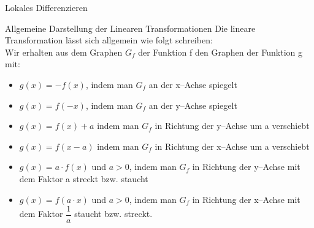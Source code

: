 \begin{section}{Lokales Differenzieren}
\begin{merke}{Allgemeine Darstellung der Linearen Transformationen}{}
Die lineare Transformation lässt sich allgemein wie folgt schreiben:\\
Wir erhalten aus dem Graphen $G_f$ der Funktion f den Graphen der Funktion g mit:
\begin{itemize}
\item $g(x) = - f(x)$, indem man $G_f$ an der x--Achse spiegelt
\item $g(x) =f(-x)$, indem man $G_f$ an der y--Achse spiegelt
\item $g(x) = f(x) +a$ indem man $G_f$ in Richtung der y--Achse um a verschiebt
\item $g(x) =f(x-a)$ indem man $G_f$ in Richtung der x--Achse um a verschiebt
\item $g(x) =a\cdot f(x)$ und $a>0$, indem man $G_f$ in Richtung der y--Achse mit dem Faktor a streckt bzw. staucht
\item $g(x) =f(a\cdot x)$ und  $a>0$, indem man $G_f$ in Richtung der x--Achse mit dem Faktor $\dfrac{1}{a}$ staucht bzw. streckt.

\end{itemize}
\end{merke}
\label{lintrans}
\end{section}

